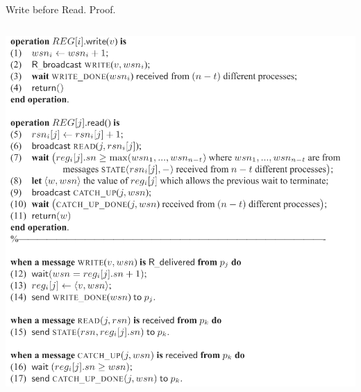 \begin{frame}{Write before Read. Proof.}
\begin{columns}[T]
\begin{column}{.5\textwidth}
            \includegraphics[scale=.465]{resources/mainalg.png}
        \end{column}
    \end{columns}
\end{frame}
